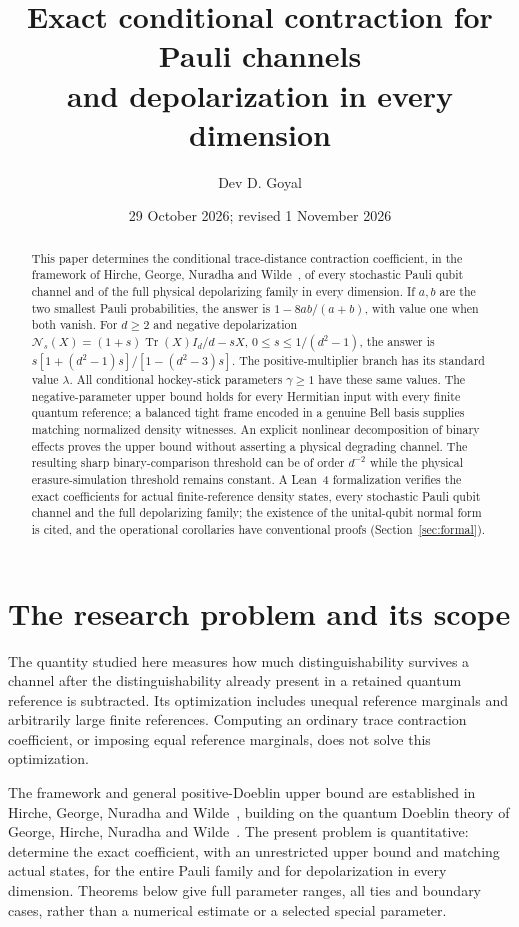 \documentclass[11pt,a4paper]{article}
\title{\vspace{-1cm}\color{ink}\textbf{Exact conditional contraction for Pauli channels\\and depolarization in every dimension}}
\author{Dev D. Goyal}
\date{29 October 2026; revised 1 November 2026}
\newcommand{\Tr}{\operatorname{Tr}}
\newcommand{\cN}{\mathcal N}
\begin{document}
\maketitle
\begin{abstract}
This paper determines the conditional trace-distance contraction coefficient, in the framework of Hirche, George, Nuradha and Wilde~\cite{Conditional}, of every stochastic Pauli qubit channel and of the full physical depolarizing family in every dimension. If $a,b$ are the two smallest Pauli probabilities, the answer is $1-8ab/(a+b)$, with value one when both vanish. For $d\ge2$ and negative depolarization $\cN_s(X)=(1+s)\Tr(X)I_d/d-sX$, $0\le s\le1/(d^2-1)$, the answer is $s[1+(d^2-1)s]/[1-(d^2-3)s]$. The positive-multiplier branch has its standard value $\lambda$. All conditional hockey-stick parameters $\gamma\ge1$ have these same values. The negative-parameter upper bound holds for every Hermitian input with every finite quantum reference; a balanced tight frame encoded in a genuine Bell basis supplies matching normalized density witnesses. An explicit nonlinear decomposition of binary effects proves the upper bound without asserting a physical degrading channel. The resulting sharp binary-comparison threshold can be of order $d^{-2}$ while the physical erasure-simulation threshold remains constant. A Lean~4 formalization verifies the exact coefficients for actual finite-reference density states, every stochastic Pauli qubit channel and the full depolarizing family; the existence of the unital-qubit normal form is cited, and the operational corollaries have conventional proofs (Section~\ref{sec:formal}).
\end{abstract}

\section{The research problem and its scope}
The quantity studied here measures how much distinguishability survives a channel after the distinguishability already present in a retained quantum reference is subtracted. Its optimization includes unequal reference marginals and arbitrarily large finite references. Computing an ordinary trace contraction coefficient, or imposing equal reference marginals, does not solve this optimization.

The framework and general positive-Doeblin upper bound are established in Hirche, George, Nuradha and Wilde~\cite{Conditional}, building on the quantum Doeblin theory of George, Hirche, Nuradha and Wilde~\cite{Doeblin}. The present problem is quantitative: determine the exact coefficient, with an unrestricted upper bound and matching actual states, for the entire Pauli family and for depolarization in every dimension. Theorems below give full parameter ranges, all ties and boundary cases, rather than a numerical estimate or a selected special parameter.
\end{document}
